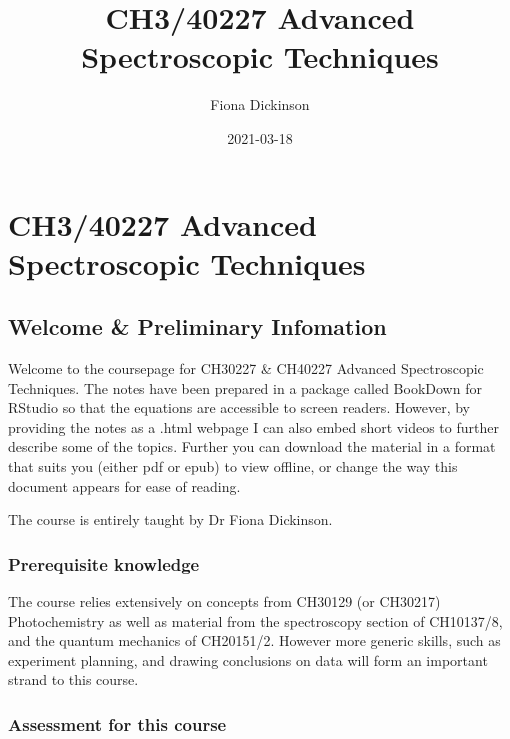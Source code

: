 \documentclass[
]{book}
\title{CH3/40227 Advanced Spectroscopic Techniques}
\author{Fiona Dickinson}
\date{2021-03-18}
\begin{document}
\maketitle

{
\setcounter{tocdepth}{1}
\tableofcontents
}
\hypertarget{ch340227-advanced-spectroscopic-techniques}{%
\chapter*{CH3/40227 Advanced Spectroscopic Techniques}\label{ch340227-advanced-spectroscopic-techniques}}

\hypertarget{welcome-preliminary-infomation}{%
\section*{Welcome \& Preliminary Infomation}\label{welcome-preliminary-infomation}}

Welcome to the coursepage for CH30227 \& CH40227 Advanced Spectroscopic Techniques. The notes have been prepared in a package called BookDown for RStudio so that the equations are accessible to screen readers. However, by providing the notes as a .html webpage I can also embed short videos to further describe some of the topics. Further you can download the material in a format that suits you (either pdf or epub) to view offline, or change the way this document appears for ease of reading.

The course is entirely taught by Dr Fiona Dickinson.

\hypertarget{prerequisite-knowledge}{%
\subsection*{Prerequisite knowledge}\label{prerequisite-knowledge}}

The course relies extensively on concepts from CH30129 (or CH30217) Photochemistry as well as material from the spectroscopy section of CH10137/8, and the quantum mechanics of CH20151/2. However more generic skills, such as experiment planning, and drawing conclusions on data will form an important strand to this course.

\hypertarget{assessment-for-this-course}{%
\subsection*{Assessment for this course}\label{assessment-for-this-course}}
\end{document}
